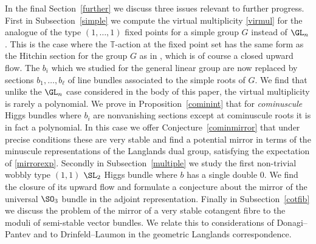 \documentclass[12pt]{article}
\numberwithin{equation}{section}
\theoremstyle{remark}
\theoremstyle{definition}
\numberwithin{theorem}{section}
\def\beq{\begin{eqnarray}}
\def\eeq{\end{eqnarray}}
\def\calN{{\mathcal{N}}}
\def\M{{\mathcal{M}}}
\newcommand{\T}{{\mathbb{T}}}
\renewcommand{\1}{\mathbbm{1}}
\begin{document}
In the final Section~\ref{further} we discuss three issues relevant to further progress. First in Subsection~\ref{simple} we compute the virtual multiplicity \eqref{virmul} for the analogue of  the type $(1,\dots,1)$ fixed points for a simple group $G$ instead of $\GL_n$. This is the case where the $\T$-action at the fixed point set has the same form as the Hitchin section for the group $G$ as in \cite{hitchin-lie}, which is of course a closed upward flow. The $b_i$ which we studied for the general linear group are now replaced by sections $b_1,\dots, b_{\ell}$ of line bundles associated to the simple roots of $G$.
We find that unlike  the $\GL_n$ case considered in the body of this paper, the virtual multiplicity is rarely a polynomial. We prove in Proposition~\ref{cominint} that for {\em cominuscule} Higgs bundles where $b_i$ are nonvanishing sections except at  cominuscule roots it is in fact a polynomial.  In this case we offer Conjecture~\ref{cominmirror} that under precise conditions these are very stable and find a potential mirror in terms of the minuscule representations of the Langlands dual group, satisfying the expectation of \eqref{mirrorexp}. Secondly in Subsection~\ref{multiple} we study the first non-trivial wobbly type $(1,1)$ $\SL_2$ Higgs bundle where $b$ has a single double $0$. We find the closure of its upward flow and formulate a conjecture about the mirror of the universal  $\SO_3$ bundle  in the adjoint representation. Finally in Subsection~\ref{cotfib} we discuss the problem of the mirror of a very stable cotangent fibre to the moduli of semi-stable vector bundles. We relate this to considerations of Donagi--Pantev and to Drinfeld--Laumon in the geometric Langlands correspondence. 



\end{document}
